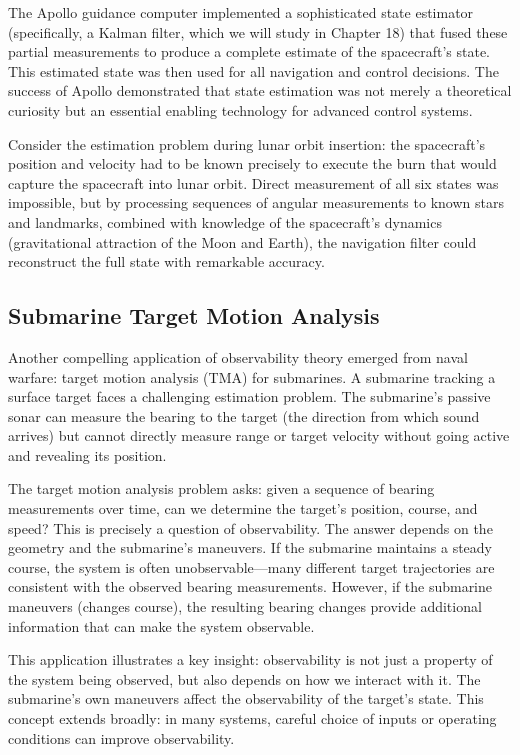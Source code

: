 The Apollo guidance computer implemented a sophisticated state estimator (specifically, a Kalman filter, which we will study in Chapter 18) that fused these partial measurements to produce a complete estimate of the spacecraft's state. This estimated state was then used for all navigation and control decisions. The success of Apollo demonstrated that state estimation was not merely a theoretical curiosity but an essential enabling technology for advanced control systems.

Consider the estimation problem during lunar orbit insertion: the spacecraft's position and velocity had to be known precisely to execute the burn that would capture the spacecraft into lunar orbit. Direct measurement of all six states was impossible, but by processing sequences of angular measurements to known stars and landmarks, combined with knowledge of the spacecraft's dynamics (gravitational attraction of the Moon and Earth), the navigation filter could reconstruct the full state with remarkable accuracy.

\subsection{Submarine Target Motion Analysis}

Another compelling application of observability theory emerged from naval warfare: target motion analysis (TMA) for submarines. A submarine tracking a surface target faces a challenging estimation problem. The submarine's passive sonar can measure the bearing to the target (the direction from which sound arrives) but cannot directly measure range or target velocity without going active and revealing its position.

The target motion analysis problem asks: given a sequence of bearing measurements over time, can we determine the target's position, course, and speed? This is precisely a question of observability. The answer depends on the geometry and the submarine's maneuvers. If the submarine maintains a steady course, the system is often unobservable---many different target trajectories are consistent with the observed bearing measurements. However, if the submarine maneuvers (changes course), the resulting bearing changes provide additional information that can make the system observable.

This application illustrates a key insight: observability is not just a property of the system being observed, but also depends on how we interact with it. The submarine's own maneuvers affect the observability of the target's state. This concept extends broadly: in many systems, careful choice of inputs or operating conditions can improve observability.

